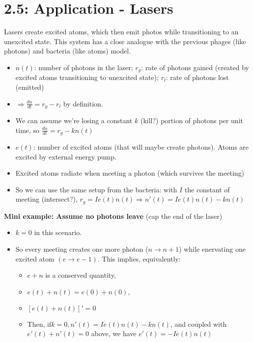 \documentclass[11pt, oneside]{article}   	%
\begin{document}
\section{2.5: Application - Lasers}

Lasers create excited atoms, which then emit photos while transitioning to an unexcited state.  This system has a close analogue with the previous phages (like photons) and bacteria (like atoms) model.

\begin{itemize}
\item $n(t)$: number of photons in the laser; $r_g$: rate of photons gained (created by excited atoms transitioning to unexcited state); $r_l$: rate of photons lost (emitted)
\item $\Rightarrow \frac{dn}{dt} = r_g - r_l$ by definition.
\item We can assume we're losing a constant $k$ (kill?) portion of photons per unit time, so $ \frac{dn}{dt} = r_g - kn(t)$
\item $e(t)$: number of excited atoms (that will maybe create photons).  Atoms are excited by external energy pump.
\item Excited atoms radiate when meeting a photon (which survives the meeting)
\item So we can use the same setup from the bacteria: with $I$ the constant of meeting (intersect?), $r_g = Ie(t)n(t) \Rightarrow n'(t) = Ie(t)n(t) - kn(t)$
\end{itemize}

\textbf{Mini example: Assume no photons leave} (cap the end of the laser)

\begin{itemize}
\item $k = 0$ in this scenario.
\item So every meeting creates one more photon ($n \rightarrow n + 1$) while enervating one excited atom $(e \rightarrow e - 1)$.  This implies, equivalently:
\begin{itemize}
\item $e+n$ is a conserved quantity,
\item $e(t) + n(t) = e(0) + n(0),$
\item $[e(t) + n(t)]' = 0$
\item Then, if$ k=0,  n'(t) = Ie(t)n(t) - kn(t)$, and coupled with $e'(t) + n'(t) = 0$ above, we have $e'(t) = -Ie(t)n(t)$
\end{itemize}
\end{itemize}
\end{document}
